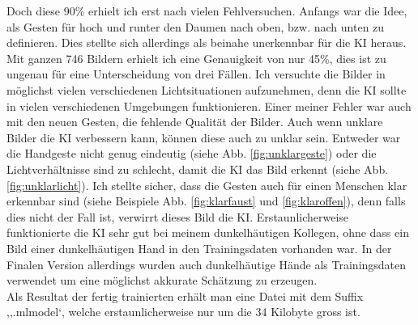 \documentclass[12pt]{article}
\begin{document}
Doch diese 90\% erhielt ich erst nach vielen Fehlversuchen. Anfangs war die Idee, als Gesten für hoch und runter den Daumen nach oben, bzw. nach unten zu definieren. Dies stellte sich allerdings als beinahe unerkennbar für die KI heraus. Mit ganzen 746 Bildern erhielt ich eine Genauigkeit von nur 45\%, dies ist zu ungenau für eine Unterscheidung von drei Fällen. Ich versuchte die Bilder in möglichst vielen verschiedenen Lichtsituationen aufzunehmen, denn die KI sollte in vielen verschiedenen Umgebungen funktionieren. Einer meiner Fehler war auch mit den neuen Gesten, die fehlende Qualität der Bilder. Auch wenn unklare Bilder die KI verbessern kann, können diese auch zu unklar sein. Entweder war die Handgeste nicht genug eindeutig (siehe Abb. \ref{fig:unklargeste}) oder die Lichtverhältnisse sind zu schlecht, damit die KI das Bild erkennt (siehe Abb. \ref{fig:unklarlicht}). Ich stellte sicher, dass die Gesten auch für einen Menschen klar erkennbar sind (siehe Beispiele Abb. \ref{fig:klarfaust} und \ref{fig:klaroffen}), denn falls dies nicht der Fall ist, verwirrt dieses Bild die KI. Erstaunlicherweise funktionierte die KI sehr gut bei meinem dunkelhäutigen Kollegen, ohne dass ein Bild einer dunkelhäutigen Hand in den Trainingsdaten vorhanden war. In der Finalen Version allerdings wurden auch dunkelhäutige Hände als Trainingsdaten verwendet um eine möglichst akkurate Schätzung zu erzeugen.\\ Als Resultat der fertig trainierten erhält man eine Datei mit dem Suffix ,,.mlmodel`, welche erstaunlicherweise nur um die 34 Kilobyte gross ist.
\end{document}
